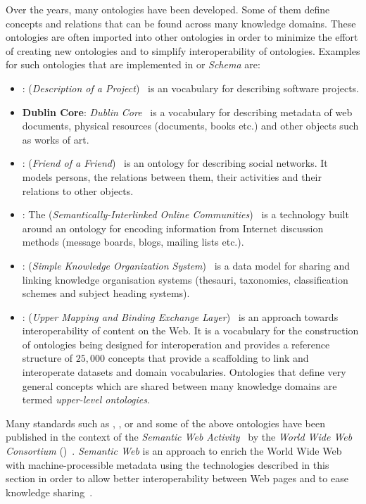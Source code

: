 Over the years, many ontologies have been developed. Some of them define concepts and relations that can be found across many knowledge domains. These ontologies are often imported into other ontologies in order to minimize the effort of creating new ontologies and to simplify interoperability of ontologies. Examples for such ontologies that are implemented in  or \emph{ Schema} are:
\begin{itemize}
  \item \textbf{}:  (\emph{Description of a Project})~\cite{DOAP} is an vocabulary for describing software projects.
  \item \textbf{Dublin Core}: \emph{Dublin Core}~\cite{DublinCoreWeb,rfc5013} is a vocabulary for describing metadata of web documents, physical resources (documents, books etc.) and other objects such as works of art.
  \item \textbf{}:  (\emph{Friend of a Friend})~\cite{FOAFWeb,FOAF} is an ontology for describing social networks. It models persons, the relations between them, their activities and their relations to other objects.
  \item \textbf{}: The  (\emph{Semantically-Interlinked Online Communities})~\cite{SIOC} is a technology built around an ontology for encoding information from Internet discussion methods (message boards, blogs, mailing lists etc.).
  \item \textbf{}:  (\emph{Simple Knowledge Organization System})~\cite{SKOSWeb,SKOS} is a data model for sharing and linking knowledge organisation systems (thesauri, taxonomies, classification schemes and subject heading systems).
  \item \textbf{}:  (\emph{Upper Mapping and Binding Exchange Layer})~\cite{UMBEL} is an approach towards interoperability of content on the Web. It is a vocabulary for the construction of ontologies being designed for interoperation and provides a reference structure of $25,000$ concepts that provide a scaffolding to link and interoperate datasets and domain vocabularies. Ontologies that define very general concepts which are shared between many knowledge domains are termed \emph{upper-level ontologies}.~\cite{upper_ontology}
\end{itemize}

Many standards such as , , or  and some of the above ontologies have been published in the context of the \emph{ Semantic Web Activity}~\cite{w3c_semantic_web} by the \emph{World Wide Web Consortium} ()~\cite{W3C}. \emph{Semantic Web} is an approach to enrich the World Wide Web with machine-processible metadata using the technologies described in this section in order to allow better interoperability between Web pages and to ease knowledge sharing~\cite{semantic_web}.

